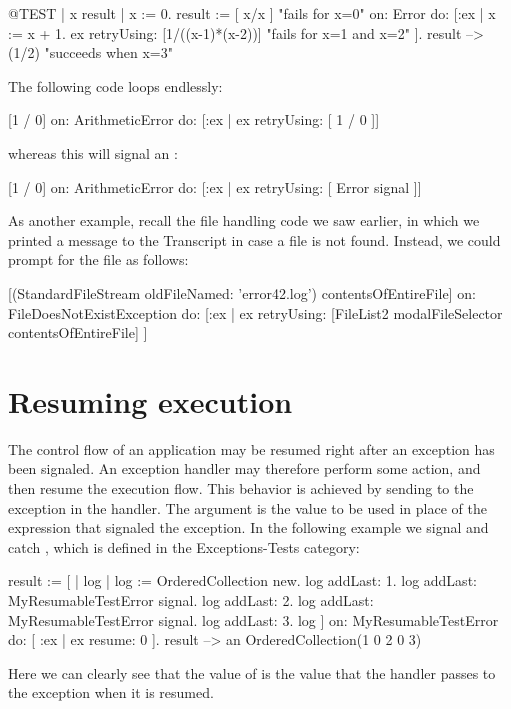 \documentclass[a4paper,10pt,twoside]{book}
\begin{document}
\begin{code}{@TEST | x result |}
x := 0.
result := [ x/x ]    "fails for x=0"
	on: Error
	do: [:ex |
		x := x + 1.
		ex retryUsing: [1/((x-1)*(x-2))]    "fails for x=1 and x=2"
	].
result --> (1/2)    "succeeds when x=3"
\end{code}

The following code loops endlessly:
\begin{code}{}
[1 / 0] on: ArithmeticError do: [:ex | ex retryUsing: [ 1 / 0 ]]
\end{code}
whereas this will signal an : 
\begin{code}{}
[1 / 0] on: ArithmeticError do: [:ex | ex retryUsing: [ Error signal ]]
\end{code}

As another example, recall the file handling code we saw earlier, in which we printed a message to the Transcript in case a file is not found. Instead, we could prompt for the file as follows:
\begin{code}{}
[(StandardFileStream oldFileNamed: 'error42.log') contentsOfEntireFile]
	on: FileDoesNotExistException
	do: [:ex | ex retryUsing: [FileList2 modalFileSelector contentsOfEntireFile] ]
\end{code}

\section{Resuming execution}

The control flow of an application may be resumed right after an exception has been signaled. An exception handler may therefore perform some action, and then resume the execution flow. This behavior is achieved by sending  to the exception in the handler.
The argument is the value to be used in place of the expression that signaled the exception.
In the following example we signal and catch , which is defined in the Exceptions-Tests category:

\begin{code}{}
result := [ | log |
	log := OrderedCollection new.
	log addLast: 1.
	log addLast: MyResumableTestError signal. 
	log addLast: 2.
	log addLast: MyResumableTestError signal.
	log addLast: 3.
	log ] 
		on: MyResumableTestError 
		do: [ :ex |  ex resume: 0 ].
result --> an OrderedCollection(1 0 2 0 3)
\end{code}
Here we can clearly see that the value of  is the value that the handler passes to the exception when it is resumed.
\end{document}
